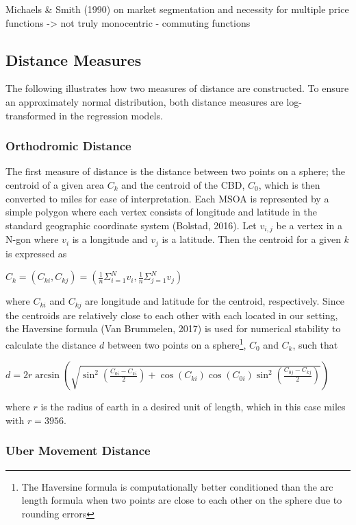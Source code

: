 \documentclass{article}
\begin{document}
Michaels \& Smith (1990) on market segmentation and necessity for multiple price functions -> not truly monocentric - commuting functions


\subsection{Distance Measures}
The following illustrates how two measures of distance are constructed. To ensure an approximately normal distribution, both distance measures are log-transformed in the regression models.
\subsubsection{Orthodromic Distance}
The first measure of distance is the distance between two points on a sphere; the centroid of a given area $C_k$ and the centroid of the CBD, $C_0$, which is then converted to miles for ease of interpretation. Each MSOA is represented by a simple polygon where each vertex consists of longitude and latitude in the standard geographic coordinate system (Bolstad, 2016). Let $v_{i,j}$ be a vertex in a N-gon where $v_i$ is a longitude and $v_j$ is a latitude. Then the centroid for a given $k$ is expressed as 

\begin{center}
    $C_k = (C_{ki}, C_{kj})  = (\frac{1}{n} \Sigma_{i=1}^{N} v_i, \frac{1}{n} \Sigma_{j=1}^{N} v_j) $
\end{center}

where $C_{ki}$ and $C_{kj}$ are longitude and latitude for the centroid, respectively. Since the centroids are relatively close to each other with each located in our setting, the Haversine formula (Van Brummelen, 2017) is used for numerical stability to calculate the distance $d$ between two points on a sphere\footnote{The Haversine formula is computationally better conditioned than the arc length formula when two points are close to each other on the sphere due to rounding errors}, $C_0$ and $C_k$, such that

\begin{center}
    $d =2 r \arcsin \left(\sqrt{\sin ^{2}\left(\frac{C_{0i}-C_{ki}}{2}\right)+\cos \left(C_{ki}\right) \cos \left(C_{0i}\right) \sin ^{2}\left(\frac{C_{0j}-C_{kj}}{2}\right)}\right)$
\end{center}
where $r$ is the radius of earth in a desired unit of length, which in this case miles with $r = 3956$. 

\subsubsection{Uber Movement Distance}
\end{document}
